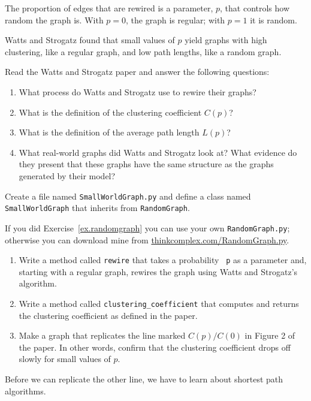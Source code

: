 \documentclass[10pt]{book}
\begin{document}
The proportion of edges that are rewired is a parameter, $p$,
that controls how random the graph is.  With $p=0$, the graph
is regular; with $p=1$ it is random.

Watts and Strogatz found that small values of $p$ yield graphs
with high clustering, like a regular graph, and low path
lengths, like a random graph.

\begin{exercise}

Read the Watts and Strogatz paper and answer the following
questions:

\begin{enumerate}

\item What process do Watts and Strogatz use to rewire their
graphs?

\item What is the definition of the clustering coefficient $C(p)$?

\item What is the definition of the average path length $L(p)$?

\item What real-world graphs did Watts and Strogatz look at?
What evidence do they present that these graphs have the
same structure as the graphs generated by their model?

\end{enumerate}

\end{exercise}


\begin{exercise}

Create a file named {\tt SmallWorldGraph.py} and define a class named
{\tt SmallWorldGraph} that inherits from {\tt RandomGraph}.

If you did Exercise~\ref{ex.randomgraph} you can use your own
{\tt RandomGraph.py}; otherwise you can download mine from
\url{thinkcomplex.com/RandomGraph.py}.

\begin{enumerate}

\item Write a method called {\tt rewire} that takes a probability {\tt
  p} as a parameter and, starting with a regular graph, rewires
the graph using Watts and Strogatz's algorithm.

\item Write a method called \verb"clustering_coefficient" that
computes and returns the clustering coefficient as defined in the
paper.

\item Make a graph that replicates the line marked $C(p)/C(0)$ in
Figure 2 of the paper.  In other words,
confirm that the clustering coefficient drops off slowly for
small values of $p$.

\end{enumerate}

Before we can replicate the other line, we have to learn about shortest
path algorithms.

\end{exercise}
\end{document}
